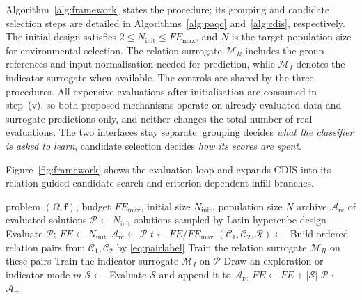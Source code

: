 \documentclass[final,5p,times,twocolumn]{elsarticle}
\newcommand{\vf}{\mathbf{f}}
\begin{document}
Algorithm~\ref{alg:framework} states the procedure; its grouping and candidate
selection steps are detailed in Algorithms~\ref{alg:paqc}
and~\ref{alg:cdis}, respectively. The initial design satisfies
$2\leq N_{\mathrm{init}}\leq FE_{\max}$, and $N$ is the target population size
for environmental selection. The relation surrogate $\mathcal{M}_R$ includes
the group references and input normalisation needed for prediction, while
$\mathcal{M}_I$ denotes the indicator surrogate when available. The controls
are shared by the three procedures.
All expensive evaluations
after initialisation are consumed in step~(v), so both proposed mechanisms operate on already
evaluated data and surrogate predictions only, and neither changes the total
number of real evaluations. The two interfaces stay separate: grouping
decides \emph{what the classifier is asked to learn}, candidate selection
decides \emph{how its scores are spent}.

Figure~\ref{fig:framework} shows the evaluation loop and expands CDIS into its
relation-guided candidate search and criterion-dependent infill branches.


\begin{algorithm}[t]
\caption{PACDIS}
\label{alg:framework}
\begin{algorithmic}[1]
\Require problem $(\Omega,\vf)$, budget $FE_{\max}$, initial size
         $N_{\mathrm{init}}$, population size $N$
\Ensure archive $\mathcal{A}_{\mathrm{rc}}$ of evaluated solutions
\State $\mathcal{P}\gets N_{\mathrm{init}}$ solutions sampled by Latin hypercube design
\State Evaluate $\mathcal{P}$; $FE\gets N_{\mathrm{init}}$
\State $\mathcal{A}_{\mathrm{rc}}\gets\mathcal{P}$
  \State $t\gets FE/FE_{\max}$
  \State $(\mathcal{C}_1,\mathcal{C}_2,\mathcal{R})\gets$
  \State Build ordered relation pairs from $\mathcal{C}_1,\mathcal{C}_2$ by
         \eqref{eq:pairlabel}
  \State Train the relation surrogate $\mathcal{M}_R$ on these pairs
  \State Train the indicator surrogate $\mathcal{M}_I$ on $\mathcal{P}$
  \State Draw an exploration or indicator mode $m$
  \State $\mathcal{S}\gets$ 
  \State Evaluate $\mathcal{S}$ and append it to $\mathcal{A}_{\mathrm{rc}}$
  \State $FE\gets FE+|\mathcal{S}|$
  \State $\mathcal{P}\gets$ 
\EndWhile
\State \Return $\mathcal{A}_{\mathrm{rc}}$
\end{algorithmic}
\end{algorithm}
\end{document}
